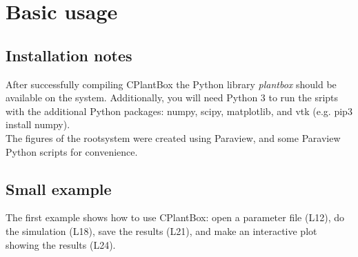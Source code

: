 \newpage
\section{Basic usage} \label{sec:basic}

\subsection{Installation notes}

After successfully compiling CPlantBox the Python library \emph{plantbox} should be available on the system. %
Additionally, you will need Python 3 to run the sripts with the additional Python packages: numpy, scipy, matplotlib, and vtk (e.g. pip3 install numpy). \\

The figures of the rootsystem were created using Paraview, and some Paraview Python scripts for convenience. %

\subsection{Small example}

The first example shows how to use CPlantBox: open a parameter file (L12), do the simulation (L18), 
save the results (L21), and make an interactive plot showing the results (L24). 

 

